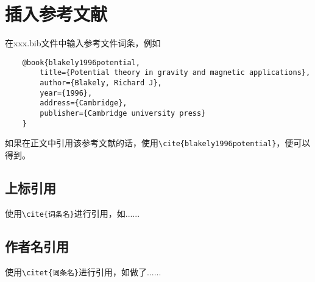 \chapter{插入参考文献}
在xxx.bib文件中输入参考文件词条，例如
\begin{verbatim}
	@book{blakely1996potential,
		title={Potential theory in gravity and magnetic applications},
		author={Blakely, Richard J},
		year={1996},
		address={Cambridge},
		publisher={Cambridge university press}
	}
\end{verbatim}

如果在正文中引用该参考文献的话，使用\verb|\cite{blakely1996potential}|，便可以得到\cite{blakely1996potential}。
\section{上标引用}
使用\verb|\cite{词条名}|进行引用，如\cite{hofmann2006physical}......

\section{作者名引用}
使用\verb|\citet{词条名}|进行引用，如\citet{blakely1996potential}做了......
